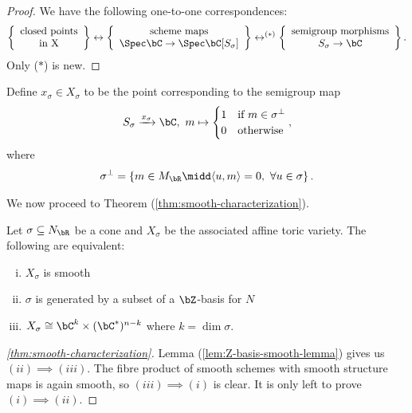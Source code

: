 \begin{proof}
	We have the following one-to-one correspondences:
	\begin{align*}
		\left\{\begin{array}{c}
			\text{closed points} \\
			\text{in X}
		\end{array}\right\} \leftrightarrow 
		\left\{\begin{array}{c}
			\text{scheme maps} \\
			\Spec \bC \to \Spec \bC[S_\sigma]
		\end{array}\right\} \leftrightarrow^{(*)} 
		\left\{\begin{array}{c}
			\text{semigroup morphisms} \\
			S_\sigma \to \bC
		\end{array}\right\}.
	\end{align*}
	Only ($\ast$) is new. 
\end{proof}

\begin{defn}\label{defn:perp-cone-distinguished-semigroup-hom}
	Define $x_\sigma \in X_\sigma$ to be the point corresponding to the semigroup map
	\begin{align*}
		S_\sigma \xrightarrow{x_\sigma} \bC, ~ m \mapsto 
		\begin{cases}
			1 & \text{if } m \in \sigma^\perp \\
			0 & \text{otherwise} 
		\end{cases},
	\end{align*}
	where
	\begin{align*}
		\sigma^\perp = \left\{m\in M_\bR \midd \langle u,m\rangle = 0, ~\forall u \in \sigma\right\} .
	\end{align*}
\end{defn}
We now proceed to Theorem (\ref{thm:smooth-characterization}).
\begin{thm}\label{thm:smooth-characterization}
	Let  $\sigma \subseteq N_\bR$ be a cone and $X_\sigma$ be the associated affine toric variety. The following are equivalent:
	\begin{enumerate}[(i)]
		\item $X_\sigma$ is smooth
		\item $\sigma$ is generated by a subset of a $\bZ$-basis for $N$ 
		\item $X_\sigma \cong \bC^k \times (\bC^*)^{n-k}$ where $k = \dim \sigma$.
	\end{enumerate}
\end{thm}
\begin{proof}[\ref{thm:smooth-characterization}]
	Lemma (\ref{lem:Z-basis-smooth-lemma}) gives us $(ii)\implies (iii)$. The fibre product of smooth schemes with smooth structure maps is again smooth, so $(iii)\implies (i)$ is clear. It is only left to prove $(i) \implies (ii)$. 
\end{proof}


